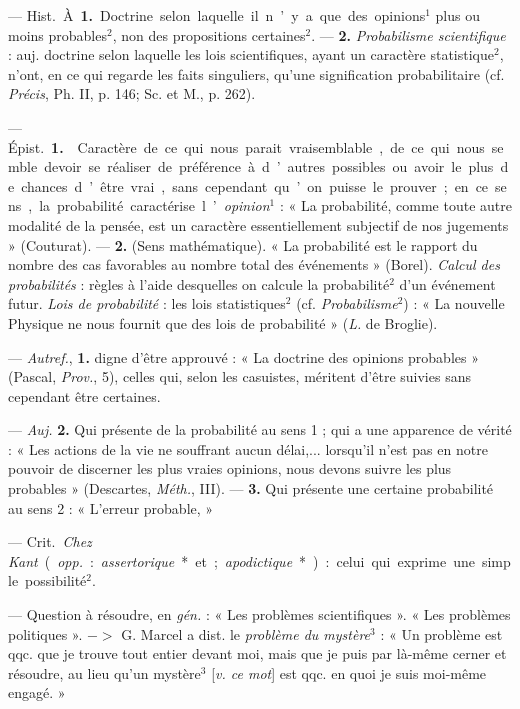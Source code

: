 \begin{itemize}[leftmargin=1cm, label=, itemsep=1pt]
 — \si{Hist.} À. {\bf 1.} Doctrine selon laquelle il n’y a
que des opinions$^1$ plus ou moins probables$^2$, non des propositions
certaines$^2$. — {\bf 2.} {\it Probabilisme scientifique} : auj. doctrine
selon laquelle les lois scientifiques, ayant un caractère statistique$^2$,
n’ont, en ce qui regarde les faits singuliers, qu'une signification
probabilitaire (cf. {\it Précis}, Ph. II, p. 146; Sc. et M., p. 262).

 — \si{Épist.} {\bf 1.}  Caractère de ce qui
nous parait vraisemblable, de ce qui nous semble devoir se réaliser de
préférence à d’autres possibles ou avoir le plus de chances d’être vrai,
sans cependant qu’on puisse le prouver; en ce sens, la probabilité
caractérise l’{\it opinion}$^1$ : « La probabilité, comme toute autre
modalité de la pensée, est un caractère essentiellement subjectif de nos
jugements » (Couturat). — {\bf 2.}  (Sens mathématique). « La
probabilité est le rapport du nombre des
cas favorables au nombre total des événements » (Borel). {\it Calcul des
probabilités} : règles à l'aide desquelles on calcule la probabilité$^2$
d’un événement futur. {\it Lois de probabilité} : les lois statistiques$^2$
(cf. {\it Probabilisme}$^2$) : « La nouvelle Physique ne nous fournit que
des lois de probabilité » ({\it L.} de Broglie).

 — {\it Autref.}, {\bf 1.} digne d'être approuvé : « La
doctrine des opinions probables » (Pascal, {\it Prov.}, 5), celles qui,
selon les casuistes, méritent d’être suivies sans cependant être certaines.

— {\it Auj.} {\bf 2.}  Qui présente de la probabilité au sens
1 ; qui a une apparence de vérité : « Les actions de la vie ne souffrant
aucun délai,... lorsqu'il n’est pas en notre pouvoir de discerner les plus
vraies opinions, nous devons suivre les plus probables » (Descartes,
{\it Méth.}, III). —  {\bf 3.}  Qui présente une certaine
probabilité au sens 2 : « L'erreur probable, »

 — \si{Crit.} {\it Chez Kant} ({\it opp.} :
{\it assertorique}* et ; {\it apodictique}*) : celui qui exprime une simple
possibilité$^2$.

 — Question à résoudre, en {\it gén.} : « Les problèmes
scientifiques ». « Les problèmes politiques ». $->$ G. Marcel a dist. le {\it
problème du mystère}$^3$ : « Un problème est qqc. que je trouve tout entier
devant moi, mais que je puis par là-même cerner et résoudre, au lieu qu’un
mystère$^3$ [{\it v. ce mot}] est qqc. en quoi je suis moi-même engagé. »


\end{itemize}
